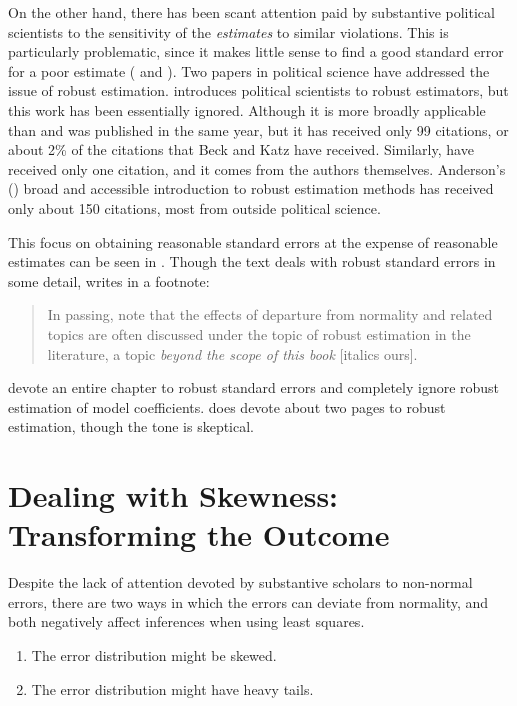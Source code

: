 \documentclass[12pt]{article}
\begin{document}
On the other hand, there has been scant attention paid by substantive political scientists to the sensitivity of the \textit{estimates} to similar violations. 
This is particularly problematic, since it makes little sense to find a good standard error for a poor estimate (\citealt{Freedman2006} and \citealt{KingRoberts2014}). 
Two papers in political science have addressed the issue of robust estimation. 
\cite{Western1995} introduces political scientists to robust estimators, but this work has been essentially ignored. 
Although it is more broadly applicable than \cite{BeckKatz1995} and was published in the same year, but it has received only 99 citations, or  about 2\% of the citations that Beck and Katz have received. 
Similarly, \cite{HardenDesmarais2011} have received only one citation, and it comes from the authors themselves.
Anderson's (\citeyear{Anderson2008}) broad and accessible introduction to robust estimation methods has received only about 150 citations, most from outside political science.

This focus on obtaining reasonable standard errors at the expense of reasonable estimates can be seen in \cite{Gujarati2004}. Though the text deals with robust standard errors in some detail, \citet[p. 339]{Gujarati2004} writes in a footnote:
\begin{quote}
In passing, note that the effects of departure from normality and related topics are often discussed under the topic of robust estimation in the literature, a topic \textit{beyond the scope of this book} [italics ours].
\end{quote}
\cite{AngristPischke2009} devote an entire chapter to robust standard errors and completely ignore robust estimation of model coefficients. 
\cite{Wooldridge2013} does devote about two pages to robust estimation, though the tone is skeptical.

\section*{Dealing with Skewness: Transforming the Outcome}

Despite the lack of attention devoted by substantive scholars to non-normal errors, there are two ways in which the errors can deviate from normality, and both negatively affect inferences when using least squares. 
\begin{enumerate}
\item The error distribution might be skewed. 
\item The error distribution might have heavy tails. 
\end{enumerate}
\end{document}
